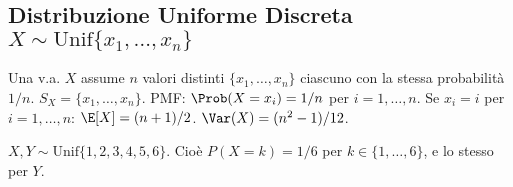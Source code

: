 \subsection{Distribuzione Uniforme Discreta \texorpdfstring{$X \sim \text{Unif}\{x_1, \dots, x_n\}$}{X ~ Unif}}
Una v.a. $X$ assume $n$ valori distinti $\{x_1, \dots, x_n\}$ ciascuno con la stessa probabilità $1/n$.
$S_X = \{x_1, \dots, x_n\}$.
PMF: $\Prob(X=x_i) = 1/n$ per $i=1, \dots, n$.
Se $x_i = i$ per $i=1, \dots, n$:
$\E[X] = (n+1)/2$.
$\Var(X) = (n^2-1)/12$.
\begin{example}
$X, Y \sim \text{Unif}\{1, 2, 3, 4, 5, 6\}$. Cioè $P(X=k)=1/6$ per $k \in \{1, \dots, 6\}$, e lo stesso per $Y$.
\end{example}


